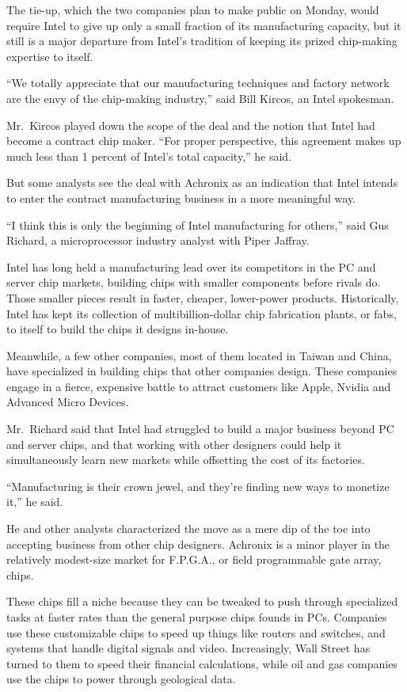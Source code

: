 ﻿\documentclass[12pt]{article}
\begin{document}
The tie-up, which the two companies plan to make public on Monday, would require Intel to give up
only a small fraction of its manufacturing capacity, but it still is a major departure from Intel's
tradition of keeping its prized chip-making expertise to itself.

``We totally appreciate that our manufacturing techniques and factory network are the envy of the
chip-making industry,'' said Bill Kircos, an Intel spokesman.

Mr.~Kircos played down the scope of the deal and the notion that Intel had become a contract chip
maker. ``For proper perspective, this agreement makes up much less than 1 percent of Intel's total
capacity,'' he said.

But some analysts see the deal with Achronix as an indication that Intel intends to enter the
contract manufacturing business in a more meaningful way.

``I think this is only the beginning of Intel manufacturing for others,'' said Gus Richard, a
microprocessor industry analyst with Piper Jaffray.

Intel has long held a manufacturing lead over its competitors in the PC and server chip markets,
building chips with smaller components before rivals do. Those smaller pieces result in faster,
cheaper, lower-power products. Historically, Intel has kept its collection of multibillion-dollar
chip fabrication plants, or fabs, to itself to build the chips it designs in-house.

Meanwhile, a few other companies, most of them located in Taiwan and China, have specialized in
building chips that other companies design. These companies engage in a fierce, expensive battle to
attract customers like Apple, Nvidia and Advanced Micro Devices.

Mr.~Richard said that Intel had struggled to build a major business beyond PC and server chips, and
that working with other designers could help it simultaneously learn new markets while offsetting
the cost of its factories.

``Manufacturing is their crown jewel, and they're finding new ways to monetize it,'' he said.

He and other analysts characterized the move as a mere dip of the toe into accepting business from
other chip designers. Achronix is a minor player in the relatively modest-size market for F.P.G.A.,
or field programmable gate array, chips.

These chips fill a niche because they can be tweaked to push through specialized tasks at faster
rates than the general purpose chips founds in PCs. Companies use these customizable chips to speed
up things like routers and switches, and systems that handle digital signals and video.
Increasingly, Wall Street has turned to them to speed their financial calculations, while oil and
gas companies use the chips to power through geological data.
\end{document}

